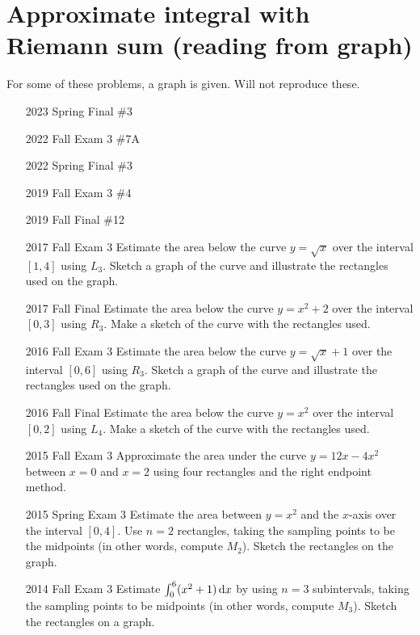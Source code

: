 \documentclass[10pt]{scrartcl}
\theoremstyle{definition}
\begin{document}
\section{Approximate integral with Riemann sum (reading from graph)}
For some of these problems, a graph is given. 
Will not reproduce these.
\begin{enumerate}
\item [2023 Spring Final \#3]
\item [2022 Fall Exam 3 \#7A]
\item [2022 Spring Final \#3]
\item [2019 Fall Exam 3 \#4]
\item [2019 Fall Final \#12]
\item [2017 Fall Exam 3] Estimate the area below the curve $y = \sqrt x$ over the interval $[1, 4]$ using $L_3$. Sketch a graph of the curve and illustrate the rectangles used on the graph.
\item [2017 Fall Final] Estimate the area below the curve $y = x^2 + 2$ over the interval $[0, 3]$ using $R_3$. Make a sketch of the curve with the rectangles used.
\item [2016 Fall Exam 3] Estimate the area below the curve $y = \sqrt x + 1$ over the interval $[0, 6]$ using $R_3$. Sketch a graph of the curve and illustrate the rectangles used on the graph.
\item [2016 Fall Final] Estimate the area below the curve $y = x^2$ over the interval $[0, 2]$ using $L_4$. Make a sketch of the curve with the rectangles used.
\item [2015 Fall Exam 3] Approximate the area under the curve $y = 12x - 4x^2$ between $x = 0$ and $x = 2$ using four rectangles and the right endpoint method.
\item [2015 Spring Exam 3] Estimate the area between $y = x^2$ and the $x$-axis over the interval $[0, 4]$. Use $n = 2$ rectangles, taking the sampling points to be the midpoints (in other words, compute $M_2$). Sketch the rectangles on the graph.
\item [2014 Fall Exam 3] Estimate $\int_0^6 (x^2 + 1) \dif x$ by using $n = 3$ subintervals, taking the sampling points to be midpoints (in other words, compute $M_3$). Sketch the rectangles on a graph.
\end{enumerate}
\end{document}
